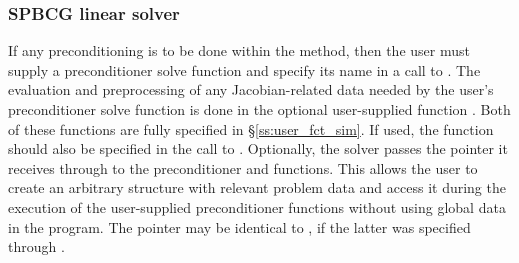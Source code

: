 \subsubsection{SPBCG linear solver}\label{sss:optin_spbcg}
If any preconditioning is to be done within the {\spbcg} method,
then the user must supply a preconditioner solve function 
and specify its name in a call to .
The evaluation and preprocessing of any Jacobian-related data needed
by the user's preconditioner solve function is done in the optional
user-supplied function . Both of these functions are
fully specified in \S\ref{ss:user_fct_sim}.
If used, the  function should also be specified in the call to
.
Optionally, the {\cvspbcg} solver passes the pointer  it
receives through  to the preconditioner
 and  functions.  This allows the user to create
an arbitrary structure with relevant problem data and access it during
the execution of the user-supplied preconditioner functions without using
global data in the program.  The pointer  may be identical
to , if the latter was specified through .

